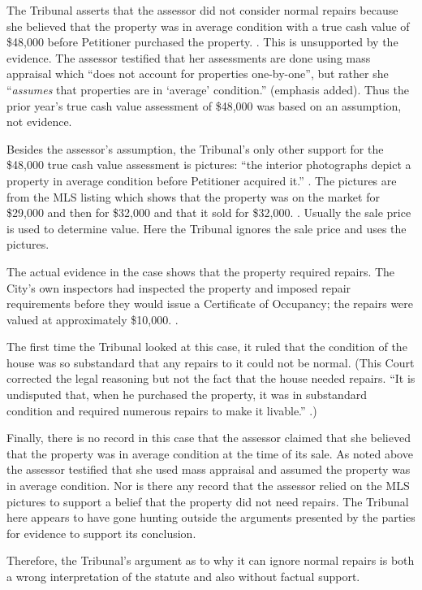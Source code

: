 \documentclass[12pt,\documentclassflag]{michiganCourtOfAppealsBrief}
\begin{document}
The Tribunal asserts that the assessor did not consider normal repairs because she believed that the property was in average condition with a true cash value of \$48,000 before Petitioner purchased the property. \reconsiderationDenied[2]. This is unsupported by the evidence. The assessor testified that her assessments are done using mass appraisal which ``does not account for properties one-by-one'', but rather she ``{\em assumes} that properties are in `average' condition.'' \foj[4] (emphasis added). Thus the prior year's true cash value assessment of \$48,000 was based on an assumption, not evidence.

Besides the assessor's assumption, the Tribunal's only other support for the \$48,000 true cash value assessment is pictures: ``the interior photographs depict a property in average condition before Petitioner acquired it.'' \reconsiderationDenied[2]. The pictures are from the MLS listing which shows that the property was on the market for \$29,000 and then for \$32,000 and that it sold for \$32,000. \mlsHistory[]. Usually the sale price is used to determine value. Here the Tribunal ignores the sale price and uses the pictures.

The actual evidence in the case shows that the property required repairs. The City's own inspectors had inspected the property and imposed repair requirements before they would issue a Certificate of Occupancy; the repairs were valued at approximately \$10,000. \repairs. 

The first time the Tribunal looked at this case, it ruled that the condition of the house was so substandard that any repairs to it could not be normal. (This Court corrected the legal reasoning but not the fact that the house needed repairs. ``It is undisputed that, when he purchased the property, it was in substandard condition and required numerous repairs to make it livable.'' .)

Finally, there is no record in this case that the assessor claimed that she believed that the property was in average condition at the time of its sale. As noted above the assessor testified that she used mass appraisal and assumed the property was in average condition. Nor is there any record that the assessor relied on the MLS pictures to support a belief that the property did not need repairs. The Tribunal here appears to have gone hunting outside the arguments presented by the parties for evidence to support its conclusion.

Therefore, the Tribunal's argument as to why it can ignore normal repairs is both a wrong interpretation of the statute and also without factual support.
\end{document}
